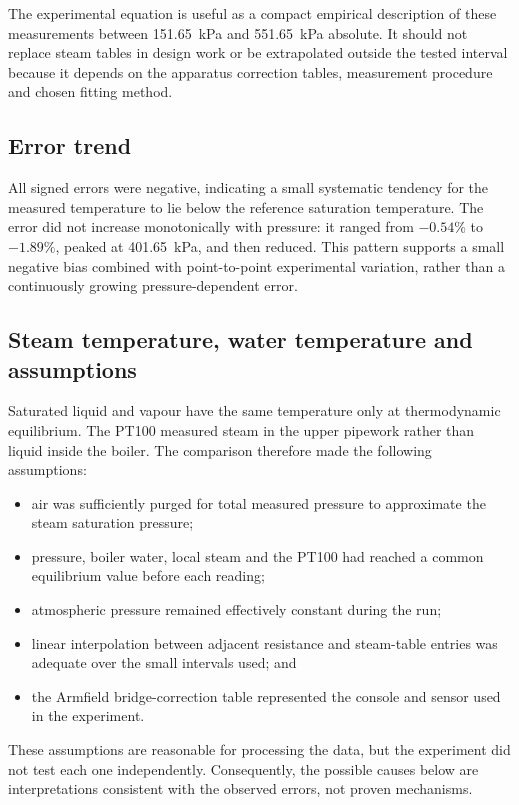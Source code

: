 \documentclass[11pt,a4paper]{article}
\begin{document}
The experimental equation is useful as a compact empirical description of
these measurements between \SI{151.65}{\kilo\pascal} and
\SI{551.65}{\kilo\pascal} absolute. It should not replace steam tables in design
work or be extrapolated outside the tested interval because it depends on the
apparatus correction tables, measurement procedure and chosen fitting method.

\subsection{Error trend}
All signed errors were negative, indicating a small systematic tendency for the
measured temperature to lie below the reference saturation temperature. The
error did not increase monotonically with pressure: it ranged from $-0.54\%$ to
$-1.89\%$, peaked at \SI{401.65}{\kilo\pascal}, and then reduced. This pattern
supports a small negative bias combined with point-to-point experimental
variation, rather than a continuously growing pressure-dependent error.

\subsection{Steam temperature, water temperature and assumptions}
Saturated liquid and vapour have the same temperature only at thermodynamic
equilibrium. The PT100 measured steam in the upper pipework rather than liquid
inside the boiler. The comparison therefore made the following assumptions:
\begin{itemize}
  \item air was sufficiently purged for total measured pressure to approximate
        the steam saturation pressure;
  \item pressure, boiler water, local steam and the PT100 had reached a common
        equilibrium value before each reading;
  \item atmospheric pressure remained effectively constant during the run;
  \item linear interpolation between adjacent resistance and steam-table entries
        was adequate over the small intervals used; and
  \item the Armfield bridge-correction table represented the console and sensor
        used in the experiment.
\end{itemize}
These assumptions are reasonable for processing the data, but the experiment
did not test each one independently. Consequently, the possible causes below
are interpretations consistent with the observed errors, not proven mechanisms.
\end{document}
